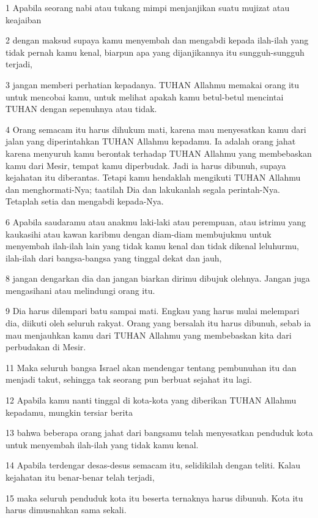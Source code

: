 \par 1 Apabila seorang nabi atau tukang mimpi menjanjikan suatu mujizat atau keajaiban
\par 2 dengan maksud supaya kamu menyembah dan mengabdi kepada ilah-ilah yang tidak pernah kamu kenal, biarpun apa yang dijanjikannya itu sungguh-sungguh terjadi,
\par 3 jangan memberi perhatian kepadanya. TUHAN Allahmu memakai orang itu untuk mencobai kamu, untuk melihat apakah kamu betul-betul mencintai TUHAN dengan sepenuhnya atau tidak.
\par 4 Orang semacam itu harus dihukum mati, karena mau menyesatkan kamu dari jalan yang diperintahkan TUHAN Allahmu kepadamu. Ia adalah orang jahat karena menyuruh kamu berontak terhadap TUHAN Allahmu yang membebaskan kamu dari Mesir, tempat kamu diperbudak. Jadi ia harus dibunuh, supaya kejahatan itu diberantas. Tetapi kamu hendaklah mengikuti TUHAN Allahmu dan menghormati-Nya; taatilah Dia dan lakukanlah segala perintah-Nya. Tetaplah setia dan mengabdi kepada-Nya.
\par 6 Apabila saudaramu atau anakmu laki-laki atau perempuan, atau istrimu yang kaukasihi atau kawan karibmu dengan diam-diam membujukmu untuk menyembah ilah-ilah lain yang tidak kamu kenal dan tidak dikenal leluhurmu, ilah-ilah dari bangsa-bangsa yang tinggal dekat dan jauh,
\par 8 jangan dengarkan dia dan jangan biarkan dirimu dibujuk olehnya. Jangan juga mengasihani atau melindungi orang itu.
\par 9 Dia harus dilempari batu sampai mati. Engkau yang harus mulai melempari dia, diikuti oleh seluruh rakyat. Orang yang bersalah itu harus dibunuh, sebab ia mau menjauhkan kamu dari TUHAN Allahmu yang membebaskan kita dari perbudakan di Mesir.
\par 11 Maka seluruh bangsa Israel akan mendengar tentang pembunuhan itu dan menjadi takut, sehingga tak seorang pun berbuat sejahat itu lagi.
\par 12 Apabila kamu nanti tinggal di kota-kota yang diberikan TUHAN Allahmu kepadamu, mungkin tersiar berita
\par 13 bahwa beberapa orang jahat dari bangsamu telah menyesatkan penduduk kota untuk menyembah ilah-ilah yang tidak kamu kenal.
\par 14 Apabila terdengar desas-desus semacam itu, selidikilah dengan teliti. Kalau kejahatan itu benar-benar telah terjadi,
\par 15 maka seluruh penduduk kota itu beserta ternaknya harus dibunuh. Kota itu harus dimusnahkan sama sekali.
